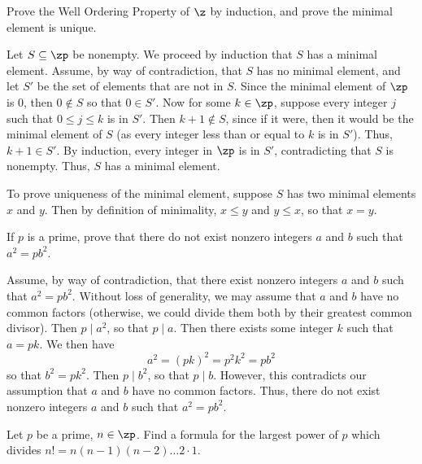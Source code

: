 \begin{exercise}\label{ex0.2.6}
    Prove the Well Ordering Property of $\z$ by induction, and prove the minimal element is unique.
\end{exercise}

\begin{sol}
    Let $S \subseteq \zp$ be nonempty. We proceed by induction that $S$ has a minimal element. Assume, by way of contradiction, that $S$ has no minimal element, and let $S'$ be the set of elements that are not in $S$. Since the minimal element of $\zp$ is 0, then $0 \not\in S$ so that $0 \in S'$. Now for some $k \in \zp$, suppose every integer $j$ such that $0 \leq j \leq k$ is in $S'$. Then $k + 1 \not\in S$, since if it were, then it would be the minimal element of $S$ (as every integer less than or equal to $k$ is in $S'$). Thus, $k + 1 \in S'$. By induction, every integer in $\zp$ is in $S'$, contradicting that $S$ is nonempty. Thus, $S$ has a minimal element.

    To prove uniqueness of the minimal element, suppose $S$ has two minimal elements $x$ and $y$. Then by definition of minimality, $x \leq y$ and $y \leq x$, so that $x = y$.
\end{sol}

\begin{exercise}\label{ex0.2.7}
    If $p$ is a prime, prove that there do not exist nonzero integers $a$ and $b$ such that $a^2 = pb^2$.
\end{exercise}

\begin{sol}
    Assume, by way of contradiction, that there exist nonzero integers $a$ and $b$ such that $a^2 = pb^2$. Without loss of generality, we may assume that $a$ and $b$ have no common factors (otherwise, we could divide them both by their greatest common divisor). Then $p \mid a^2$, so that $p \mid a$. Then there exists some integer $k$ such that $a = pk$. We then have
    \[a^2 = (pk)^2 = p^2k^2 = pb^2\]
    so that $b^2 = pk^2$. Then $p \mid b^2$, so that $p \mid b$. However, this contradicts our assumption that $a$ and $b$ have no common factors. Thus, there do not exist nonzero integers $a$ and $b$ such that $a^2 = pb^2$.
\end{sol}

\begin{exercise} \label{ex0.2.8}
    Let $p$ be a prime, $n \in \zp$. Find a formula for the largest power of $p$ which divides $n! = n(n - 1)(n - 2) \ldots 2 \cdot 1$.

\end{exercise}

